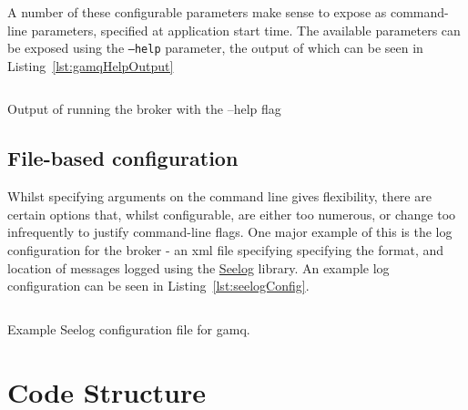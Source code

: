 A number of these configurable parameters make sense to expose as command-line
parameters, specified at application start time. The available parameters can be
exposed using the \texttt{--help} parameter, the output of which can be seen in
Listing~\ref{lst:gamqHelpOutput}

\begin{listing}[ht]
  \centering
  \inputminted{bash}{code/gamqHelpOutput}
  \caption{Output of running the broker with the --help flag}
  \label{lst:gamqHelpOutput}
\end{listing}

\subsection{File-based configuration}
\label{sub:File-based configuration}

Whilst specifying arguments on the command line gives flexibility, there are
certain options that, whilst configurable, are either too numerous, or change
too infrequently to justify command-line flags. One major example of this is the
log configuration for the broker - an \gls{xml} file specifying specifying the
format, and location of messages logged using the
\href{https://github.com/cihub/seelog}{Seelog} library. An example log
configuration can be seen in Listing~\ref{lst:seelogConfig}.

\begin{listing}[ht]
  \centering
  \inputminted{xml}{code/gamq/config/logconfig.xml}
  \caption{Example Seelog configuration file for gamq.}
  \label{lst:seelogConfig}
\end{listing}

\section{Code Structure}
\label{sec:codestructure}


